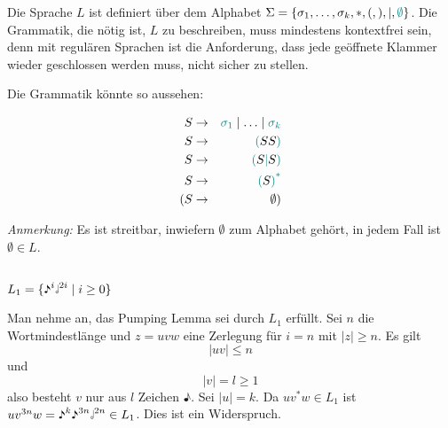 \documentclass{article}
\begin{document}
   Die Sprache $L$ ist definiert \"uber dem Alphabet $\Sigma = \{\sigma_1,
      \ldots, \sigma_k, *, (, ), |, \textcolor{teal}{\emptyset}\}$.
   Die Grammatik, die n\"otig ist, $L$ zu beschreiben, muss mindestens
   kontextfrei sein, denn mit regul\"aren Sprachen ist die Anforderung, dass jede
   ge\"offnete Klammer wieder geschlossen werden muss, nicht sicher zu stellen.

   Die Grammatik k\"onnte so aussehen:

   \begin{eqnarray*}
      S & \rightarrow & \textcolor{teal}{\sigma_1} \mid \ldots \mid
      \textcolor{teal}{\sigma_k} \\ %
      S & \rightarrow & \textcolor{teal}{(} S S \textcolor{teal}{)} \\
      S & \rightarrow & \textcolor{teal}{(} S \textcolor{teal}{\mid} S \textcolor{teal}{)} \\
      S & \rightarrow &
      \textcolor{teal}{(}S\textcolor{teal}{)}\textsuperscript{\textcolor{teal}{*}}\\
      ( S & \rightarrow & \emptyset )
   \end{eqnarray*}
   
   \emph{Anmerkung:} Es ist streitbar, inwiefern $\emptyset$ zum Alphabet
   geh\"ort, in jedem Fall ist $\emptyset\in L$. 

   \subsection{} 
   
   \subsubsection{}

   \begin{center}
   $L_1 = \{\eighthnote^i\halfnote^{2i} \mid i \ge 0\}$
   \end{center}

   Man nehme an, das Pumping Lemma sei durch $L_1$ erf\"ullt. Sei $n$ die
   Wortmindestl\"ange und $z =  uvw$ eine Zerlegung f\"ur $i = n$ mit $|z| \ge
   n$. Es gilt
   \begin{equation*}
      | uv | \le n
   \end{equation*}
   und 
   \begin{equation*}
      | v| = l \ge 1
   \end{equation*}
   also besteht $v$ nur aus $l$ Zeichen $\eighthnote$. Sei $|u|=k$.
   Da $uv^*w \in L_1$ ist $uv^{3n}w = \eighthnote^k\eighthnote^{3n}\halfnote^{2n} \in L_1$.
   Dies ist ein Widerspruch.
\end{document}
